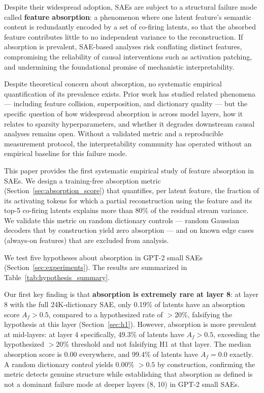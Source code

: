 \documentclass{article}
\begin{document}
Despite their widespread adoption, SAEs are subject to a structural failure mode called \textbf{feature absorption}: a phenomenon where one latent feature's semantic content is redundantly encoded by a set of co-firing latents, so that the absorbed feature contributes little to no independent variance to the reconstruction. If absorption is prevalent, SAE-based analyses risk conflating distinct features, compromising the reliability of causal interventions such as activation patching, and undermining the foundational promise of mechanistic interpretability.

Despite theoretical concern about absorption, no systematic empirical quantification of its prevalence exists. Prior work has studied related phenomena --- including feature collision, superposition, and dictionary quality --- but the specific question of how widespread absorption is across model layers, how it relates to sparsity hyperparameters, and whether it degrades downstream causal analyses remains open. Without a validated metric and a reproducible measurement protocol, the interpretability community has operated without an empirical baseline for this failure mode.

This paper provides the first systematic empirical study of feature absorption in SAEs. We design a training-free absorption metric (Section~\ref{sec:absorption_score}) that quantifies, per latent feature, the fraction of its activating tokens for which a partial reconstruction using the feature and its top-5 co-firing latents explains more than 80\% of the residual stream variance. We validate this metric on random dictionary controls --- random Gaussian decoders that by construction yield zero absorption --- and on known edge cases (always-on features) that are excluded from analysis.

We test five hypotheses about absorption in GPT-2 small SAEs (Section~\ref{sec:experiments}). The results are summarized in Table~\ref{tab:hypothesis_summary}.

Our first key finding is that \textbf{absorption is extremely rare at layer 8}: at layer 8 with the full 24K-dictionary SAE, only 0.19\% of latents have an absorption score $A_f > 0.5$, compared to a hypothesized rate of $>20\%$, falsifying the hypothesis at this layer (Section~\ref{sec:h1}). However, absorption is more prevalent at mid-layers: at layer 4 specifically, 49.3\% of latents have $A_f > 0.5$, exceeding the hypothesized $>20\%$ threshold and not falsifying H1 at that layer. The median absorption score is 0.00 everywhere, and 99.4\% of latents have $A_f = 0.0$ exactly. A random dictionary control yields 0.00\% $> 0.5$ by construction, confirming the metric detects genuine structure while establishing that absorption as defined is not a dominant failure mode at deeper layers (8, 10) in GPT-2 small SAEs.
\end{document}
